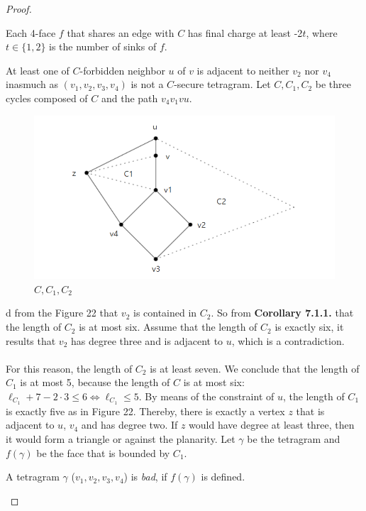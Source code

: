 \begin{proof}
\begin{itemize}
\begin{itemize}
        \begin{observation}
        Each 4-face $f$ that shares an edge with $C$ has final charge at least -2$t$, where $t \in \{1, 2\}$ is the number of sinks of $f$.
        \end{observation}
        
        At least one of $C$-forbidden neighbor $u$ of $v$ is adjacent to neither $v_2$ nor $v_4$ inasmuch as $(v_1, v_2, v_3, v_4)$ is not a $C$-secure tetragram. Let $C, C_1, C_2$ be three cycles composed of $C$ and the path $v_4v_1vu$. 
        \begin{figure}[H] %
            \centering %
            \includegraphics[width=0.8 \textwidth]{figure/cc1c2.png} 
            \caption{$C, C_1, C_2$} %
            \label{figure} %
        \end{figure}
        d from the Figure 22 that $v_2$ is contained in $C_2$. So from \textbf{Corollary 7.1.1.} that the length of $C_2$ is at most six. Assume that the length of $C_2$ is exactly six, it results that $v_2$ has degree three and is adjacent to $u$, which is a contradiction.\\ \\
        For this reason, the length of $C_2$ is at least seven. We conclude that the length of $C_1$ is at most 5, because the length of $C$ is at most six: $\ell_{C_1} + 7 - 2 \cdot 3 \leq 6 \Longleftrightarrow \ell_{C_1} \leq 5$. By means of the constraint of $u$, the length of $C_1$ is exactly five as in Figure 22. Thereby, there is exactly a vertex $z$ that is adjacent to $u$, $v_4$ and has degree two. If $z$ would have degree at least three, then it would form a triangle or against the planarity. Let $\gamma$ be the tetragram and $f(\gamma)$ be the face that is bounded by $C_1$. 
        \begin{definition}
        A tetragram $\gamma$ ($v_1, v_2, v_3, v_4$) is \textit{bad}, if $f(\gamma)$ is defined. 
        \end{definition}
        

\end{itemize}
\end{itemize}
\end{proof}
